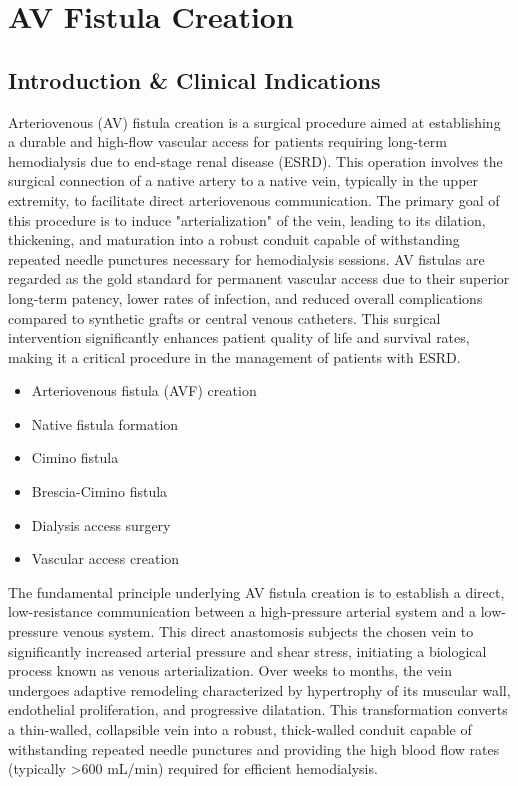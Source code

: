 \chapter{AV Fistula Creation}

\section*{Introduction \& Clinical Indications}
Arteriovenous (AV) fistula creation is a surgical procedure aimed at establishing a durable and high-flow vascular access for patients requiring long-term hemodialysis due to end-stage renal disease (ESRD). This operation involves the surgical connection of a native artery to a native vein, typically in the upper extremity, to facilitate direct arteriovenous communication. The primary goal of this procedure is to induce "arterialization" of the vein, leading to its dilation, thickening, and maturation into a robust conduit capable of withstanding repeated needle punctures necessary for hemodialysis sessions. AV fistulas are regarded as the gold standard for permanent vascular access due to their superior long-term patency, lower rates of infection, and reduced overall complications compared to synthetic grafts or central venous catheters. This surgical intervention significantly enhances patient quality of life and survival rates, making it a critical procedure in the management of patients with ESRD.

\begin{itemize}
  \item Arteriovenous fistula (AVF) creation
  \item Native fistula formation
  \item Cimino fistula
  \item Brescia-Cimino fistula
  \item Dialysis access surgery
  \item Vascular access creation
\end{itemize}

The fundamental principle underlying AV fistula creation is to establish a direct, low-resistance communication between a high-pressure arterial system and a low-pressure venous system. This direct anastomosis subjects the chosen vein to significantly increased arterial pressure and shear stress, initiating a biological process known as venous arterialization. Over weeks to months, the vein undergoes adaptive remodeling characterized by hypertrophy of its muscular wall, endothelial proliferation, and progressive dilatation. This transformation converts a thin-walled, collapsible vein into a robust, thick-walled conduit capable of withstanding repeated needle punctures and providing the high blood flow rates (typically >600 mL/min) required for efficient hemodialysis.

